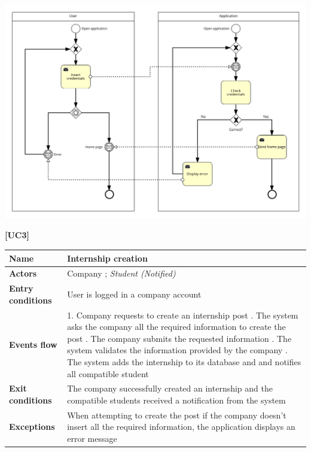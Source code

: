 \documentclass[11pt,twoside]{article}
\begin{document}
\begin{center}
\includegraphics[width=\textwidth]{Images/UC2}
\end{center}

\newpage

\large{\textbf{[UC3]}}
\begin{table}[H]
\begin{tabular}{| p{} | p{} |}
\hline
\textbf{Name}
& Internship creation \\
\hline
\textbf{Actors}
& Company ; \textit{Student (Notified)} \\
\hline
\textbf{Entry conditions}
& User is logged in a company account \\
\hline
\textbf{Events flow}
& 1. Company requests to create an internship post \newline
2. The system asks the company all the required information to create the post \newline
3. The company submits the requested information \newline
4. The system validates the information provided by the company \newline
5. The system adds the internship to its database and and notifies all compatible student \\
\hline
\textbf{Exit conditions}
& The company successfully created an internship and the compatible students received a notification from the system \\
\hline
\textbf{Exceptions}
& When attempting to create the post if the company doesn't insert all the required information, the application displays an error message \\
\hline
\end{tabular}
\end{table}
\end{document}
